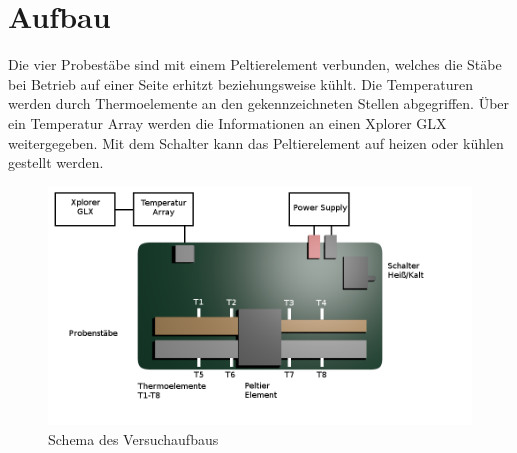 \section{Aufbau}
\label{sec:Aufbau}

Die vier Probestäbe sind mit einem Peltierelement verbunden, welches die Stäbe bei Betrieb auf einer Seite erhitzt beziehungsweise kühlt. Die Temperaturen werden durch Thermoelemente an den gekennzeichneten Stellen abgegriffen. Über ein Temperatur Array werden die Informationen an einen Xplorer GLX weitergegeben. Mit dem Schalter kann das Peltierelement auf heizen oder kühlen gestellt werden.

\begin{figure}
	\centering
	\includegraphics[scale = .45,keepaspectratio]
	{content/images/Aufbau.png}
	\caption{Schema des Versuchaufbaus}
	\label{fig:Aufbau}
\end{figure}